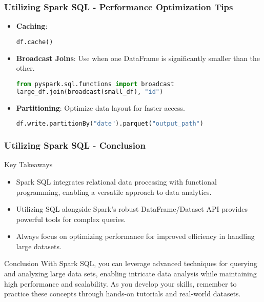 \documentclass[aspectratio=169]{beamer}
\begin{document}
\begin{frame}[fragile]
    \frametitle{Utilizing Spark SQL - Performance Optimization Tips}
    \begin{itemize}
        \item \textbf{Caching}: 
        \begin{lstlisting}[language=Python]
df.cache()
        \end{lstlisting}
        
        \item \textbf{Broadcast Joins}: Use when one DataFrame is significantly smaller than the other.
        \begin{lstlisting}[language=Python]
from pyspark.sql.functions import broadcast
large_df.join(broadcast(small_df), "id")
        \end{lstlisting}

        \item \textbf{Partitioning}: Optimize data layout for faster access.
        \begin{lstlisting}[language=Python]
df.write.partitionBy("date").parquet("output_path")
        \end{lstlisting}
    \end{itemize}
\end{frame}

\begin{frame}[fragile]
    \frametitle{Utilizing Spark SQL - Conclusion}
    \begin{block}{Key Takeaways}
        \begin{itemize}
            \item Spark SQL integrates relational data processing with functional programming, enabling a versatile approach to data analytics.
            \item Utilizing SQL alongside Spark’s robust DataFrame/Dataset API provides powerful tools for complex queries.
            \item Always focus on optimizing performance for improved efficiency in handling large datasets.
        \end{itemize}
    \end{block}
    
    \begin{block}{Conclusion}
        With Spark SQL, you can leverage advanced techniques for querying and analyzing large data sets, enabling intricate data analysis while maintaining high performance and scalability. 
        As you develop your skills, remember to practice these concepts through hands-on tutorials and real-world datasets.
    \end{block}
\end{frame}
\end{document}
